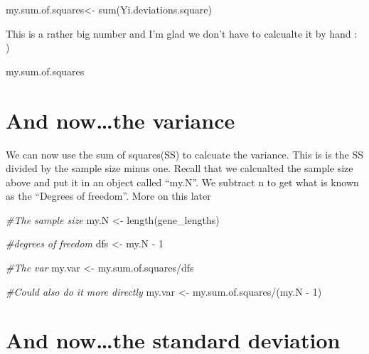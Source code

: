 \documentclass[
]{book}
\newenvironment{Shaded}{\begin{snugshade}}{\end{snugshade}}
\newcommand{\CommentTok}[1]{\textcolor[rgb]{0.56,0.35,0.01}{\textit{#1}}}
\newcommand{\DecValTok}[1]{\textcolor[rgb]{0.00,0.00,0.81}{#1}}
\newcommand{\FunctionTok}[1]{\textcolor[rgb]{0.00,0.00,0.00}{#1}}
\newcommand{\NormalTok}[1]{#1}
\newcommand{\OtherTok}[1]{\textcolor[rgb]{0.56,0.35,0.01}{#1}}
\newcommand{\SpecialCharTok}[1]{\textcolor[rgb]{0.00,0.00,0.00}{#1}}
\begin{document}
\begin{Shaded}
\begin{Highlighting}[]
\NormalTok{my.sum.of.squares}\OtherTok{\textless{}{-}} \FunctionTok{sum}\NormalTok{(Yi.deviations.square)}
\end{Highlighting}
\end{Shaded}

This is a rather big number and I'm glad we don't have to calcualte it by hand : )

\begin{Shaded}
\begin{Highlighting}[]
\NormalTok{my.sum.of.squares}
\end{Highlighting}
\end{Shaded}

\hypertarget{and-nowthe-variance}{%
\chapter{And now\ldots the variance}\label{and-nowthe-variance}}

We can now use the sum of squares(SS) to calcuate the variance. This is is the SS divided by the sample size minus one. Recall that we calcualted the sample size above and put it in an object called ``my.N''. We subtract n to get what is known as the ``Degrees of freedom''. More on this later

\begin{Shaded}
\begin{Highlighting}[]
\CommentTok{\#The sample size}
\NormalTok{my.N }\OtherTok{\textless{}{-}} \FunctionTok{length}\NormalTok{(gene\_lengths)}

\CommentTok{\#degrees of freedom}
\NormalTok{dfs }\OtherTok{\textless{}{-}}\NormalTok{ my.N }\SpecialCharTok{{-}} \DecValTok{1}

\CommentTok{\#The var}
\NormalTok{my.var }\OtherTok{\textless{}{-}}\NormalTok{ my.sum.of.squares}\SpecialCharTok{/}\NormalTok{dfs}

\CommentTok{\#Could also do it more directly}
\NormalTok{my.var }\OtherTok{\textless{}{-}}\NormalTok{ my.sum.of.squares}\SpecialCharTok{/}\NormalTok{(my.N }\SpecialCharTok{{-}} \DecValTok{1}\NormalTok{)}
\end{Highlighting}
\end{Shaded}

\hypertarget{and-nowthe-standard-deviation}{%
\chapter{And now\ldots the standard deviation}\label{and-nowthe-standard-deviation}}
\end{document}
